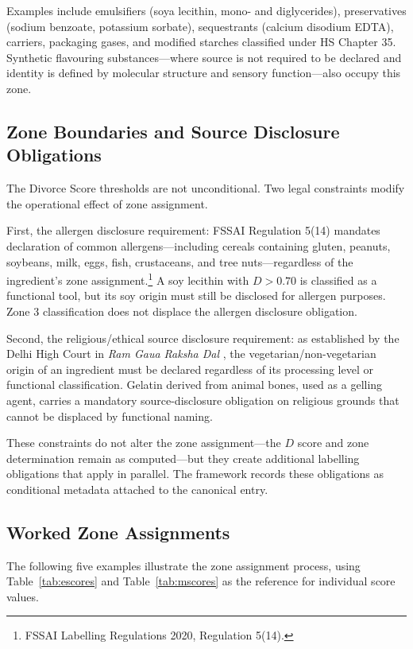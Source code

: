 \documentclass[12pt,a3paper]{article}
\begin{document}
Examples include emulsifiers (soya lecithin, mono- and diglycerides), preservatives (sodium benzoate, potassium sorbate), sequestrants (calcium disodium EDTA), carriers, packaging gases, and modified starches classified under HS Chapter 35. Synthetic flavouring substances---where source is not required to be declared and identity is defined by molecular structure and sensory function---also occupy this zone.

\subsection{Zone Boundaries and Source Disclosure Obligations}

The Divorce Score thresholds are not unconditional. Two legal constraints modify the operational effect of zone assignment.

First, the allergen disclosure requirement: FSSAI Regulation 5(14) mandates declaration of common allergens---including cereals containing gluten, peanuts, soybeans, milk, eggs, fish, crustaceans, and tree nuts---regardless of the ingredient's zone assignment.\footnote{FSSAI Labelling Regulations 2020, Regulation 5(14).} A soy lecithin with $D > 0.70$ is classified as a functional tool, but its soy origin must still be disclosed for allergen purposes. Zone 3 classification does not displace the allergen disclosure obligation.

Second, the religious/ethical source disclosure requirement: as established by the Delhi High Court in \textit{Ram Gaua Raksha Dal} \cite{DelhiHC_RamGaua_2022}, the vegetarian/non-vegetarian origin of an ingredient must be declared regardless of its processing level or functional classification. Gelatin derived from animal bones, used as a gelling agent, carries a mandatory source-disclosure obligation on religious grounds that cannot be displaced by functional naming.

These constraints do not alter the zone assignment---the $D$ score and zone determination remain as computed---but they create additional labelling obligations that apply in parallel. The framework records these obligations as conditional metadata attached to the canonical entry.

\subsection{Worked Zone Assignments}

The following five examples illustrate the zone assignment process, using Table~\ref{tab:escores} and Table~\ref{tab:mscores} as the reference for individual score values.
\end{document}
